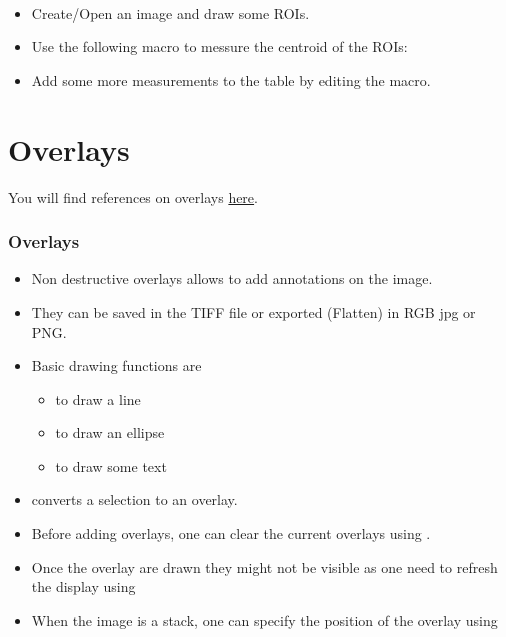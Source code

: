 \begin{frame}[fragile]
  \begin{example}[Measurements]~\par
    \begin{itemize}
    \item Create/Open an image and draw some ROIs.
    \item Use the following macro to messure the centroid of the ROIs:\par
      
    \item Add some more measurements to the table by editing the macro.
    \end{itemize}
  \end{example}
\end{frame}

\section{Overlays}
You will find references on overlays
\href{http://rsb.info.nih.gov/ij/developer/macro/functions.html#Overlay}{here}.
\begin{frame} \frametitle<presentation>{Overlays}
  \begin{itemize}
  \item Non destructive overlays allows to add annotations on the
    image.
  \item They can be saved in the TIFF file or exported (Flatten) in
    RGB jpg or PNG.
  \item Basic drawing functions are
    \begin{itemize}
    \item {} to draw a line
    \item {} to draw an ellipse
    \item {} to draw some text
    \end{itemize}
  \item {} converts a selection
    to an overlay.
  \item Before adding overlays, one can clear the current overlays
    using .
  \item Once the overlay are drawn they might not be visible as one
    need to refresh the display using 
  \item When the image is a stack, one can specify the position of the
    overlay using 
  \end{itemize}
\end{frame}


